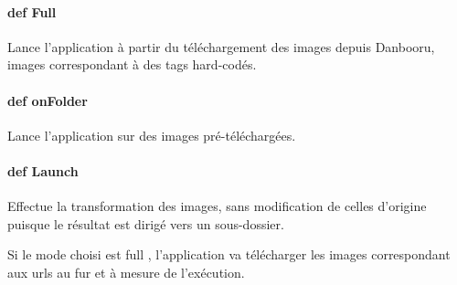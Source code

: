 \documentclass[a4paper,12pt]{article}
\begin{document}
\paragraph{def Full}
Lance l'application à partir du téléchargement des images depuis Danbooru, images correspondant à des tags hard-codés.
\paragraph{def onFolder}
Lance l'application sur des images pré-téléchargées.
\paragraph{def Launch}
Effectue la transformation des images, sans modification de celles d'origine puisque le résultat est dirigé vers un sous-dossier.

Si le mode choisi est \og full \fg, l'application va télécharger les images correspondant aux urls au fur et à mesure de l'exécution.
\end{document}
